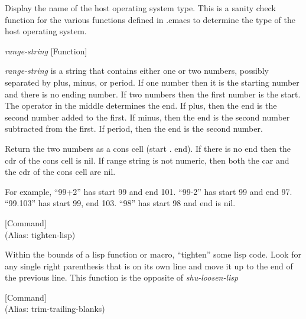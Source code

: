 \begin{doc-string}
Display the name of the host operating system type.  This is a sanity check
function for the various functions defined in .emacs to determine the type of
the host operating system.
\end{doc-string}

\vspace{1em}
\noindent
{}
\usebox{\funcname}\emph{range-string}
 \hfill [Function]

\begin{doc-string}
\emph{range-string} is a string that contains either one or two numbers, possibly
separated by plus, minus, or period.  If one number then it is the starting number
and there is no ending number.  If two numbers then the first number is the start.
The operator in the middle determines the end.  If plus, then the end is the
second number added to the first.  If minus, then the end is the second number
subtracted from the first.  If period, then the end is the second number.

Return the two numbers as a cons cell (start . end).  If there is no end then the
cdr of the cons cell is nil.  If range string is not numeric, then both the car
and the cdr of the cons cell are nil.

For example, ``99+2'' has start 99 and end 101.  ``99-2'' has start 99 and end 97.
``99.103'' has start 99, end 103.  ``98'' has start 98 and end is nil.
\end{doc-string}

\vspace{1em}
\noindent
{}
\usebox{\funcname}
 \hfill [Command]\\%
 (Alias: tighten-lisp)

\begin{doc-string}
Within the bounds of a lisp function or macro, ``tighten'' some lisp code.
Look for any single right parenthesis that is on its own line and move it up to
the end of the previous line.  This function is the opposite of \emph{shu-loosen-lisp}
\end{doc-string}

\vspace{1em}
\noindent
{}
\usebox{\funcname}
 \hfill [Command]\\%
 (Alias: trim-trailing-blanks)

